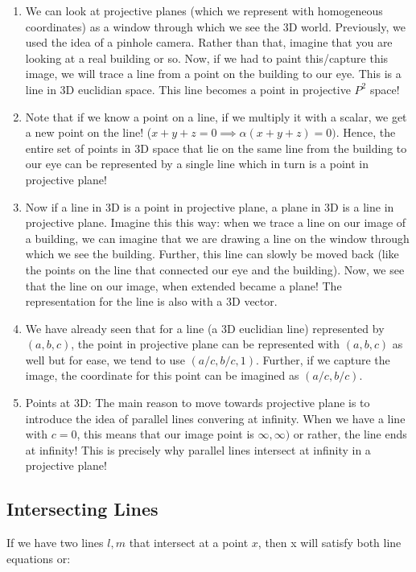 \begin{enumerate}
    \item We can look at projective planes (which we represent with homogeneous coordinates) as a window through which we see the 3D world. Previously, we used the idea of a pinhole camera. Rather than that, imagine that you are looking at a real building or so. Now, if we had to paint this/capture this image, we will trace a line from a point on the building to our eye. This is a line in 3D euclidian space. This line becomes a point in projective $P^2$ space!
    \item Note that if we know a point on a line, if we multiply it with a scalar, we get a new point on the line! ($x + y + z = 0 \implies \alpha(x+y+z)=0)$. Hence, the entire set of points in 3D space that lie on the same line from the building to our eye can be represented by a single line which in turn is a point in projective plane!
    \item Now if a line in 3D is a point in projective plane, a plane in 3D is a line in projective plane. Imagine this this way: when we trace a line on our image of a building, we can imagine that we are drawing a line on the window through which we see the building. Further, this line can slowly be moved back (like the points on the line that connected our eye and the building). Now, we see that the line on our image, when extended became a plane! The representation for the line is also with a 3D vector. 
    \item We have already seen that for a line (a 3D euclidian line) represented by $(a, b, c)$, the point in projective plane can be represented with $(a, b, c)$ as well but for ease, we tend to use $(a/c, b/c, 1)$. Further, if we capture the image, the coordinate for this point can be imagined as $(a/c, b/c)$.  
    \item Points at 3D: The main reason to move towards projective plane is to introduce the idea of parallel lines convering at infinity. When we have a line with $c=0$, this means that our image point is $\infty, \infty)$ or rather, the line ends at infinity! This is precisely why parallel lines intersect at infinity in a projective plane! 
\end{enumerate}

\subsection{Intersecting Lines}

If we have two lines $l, m$ that intersect at a point $x$, then x will satisfy both line equations or:

